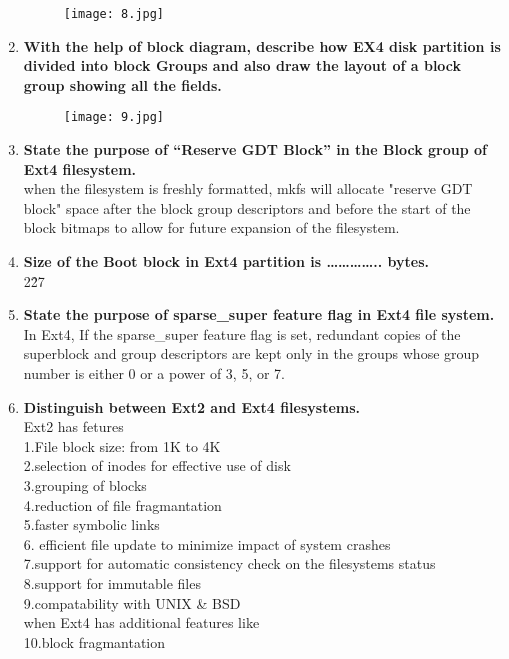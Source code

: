\documentclass[a4paper,12pt]{article}
\begin{document}
\begin{flushleft}
\begin{enumerate}
\begin{figure}[H]
 \centering
  \texttt{[image: 8.jpg]}
  \label{fig:8}
\end{figure}
\item \textbf{ With the help of block diagram, describe how EX4 disk partition is divided into block Groups and also draw the layout of a block group showing all the fields.}\\

\begin{figure}[H]
 \centering
  \texttt{[image: 9.jpg]}
  \label{fig:9}
\end{figure}
\item \textbf{ State the purpose of “Reserve GDT Block” in the Block group of Ext4 filesystem.}\\
{\color{red}when the filesystem is freshly formatted, mkfs will allocate "reserve GDT block" space
after the block group descriptors and before the start of the block bitmaps to allow for future
expansion of the filesystem.
}\\
\item \textbf{ Size of the Boot block in Ext4 partition is ………….. bytes.}\\
{\color{red}2\^27}\\
\item \textbf{ State the purpose of sparse\_super feature flag in Ext4 file system.}\\
{\color{red}In Ext4, If the sparse\_super feature flag is set,
redundant copies of the superblock and group
descriptors are kept only in the groups whose
group number is either 0 or a power of 3, 5, or 7.
}\\
\item \textbf{ Distinguish between Ext2 and Ext4 filesystems.}\\
{\color{red}Ext2 has fetures \\ 1.File block size: from 1K to 4K\\
2.selection of inodes for effective use of disk\\
3.grouping of blocks\\
4.reduction of file fragmantation\\
5.faster symbolic links\\
6. efficient file update to minimize impact of system  crashes\\
7.support for automatic consistency check on the filesystems status\\
8.support for immutable files\\
9.compatability with UNIX \& BSD\\when Ext4 has additional features like \\10.block fragmantation\\
}
\end{enumerate}
\end{flushleft}
\end{document}
